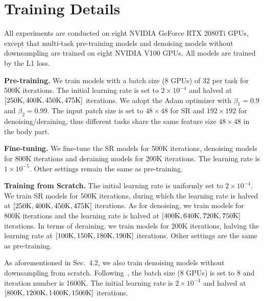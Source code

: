 \documentclass[runningheads]{llncs}
\begin{document}
	\section{Training Details}
	
	All experiments are conducted on eight NVIDIA GeForce RTX 2080Ti GPUs, except that multi-task pre-training models and denoising models without downsampling are trained on eight NVIDIA V100 GPUs. All models are trained by the L1 loss.
	
	
	\vspace{0.05in}
	\noindent\textbf{Pre-training.} We train models with a batch size (8 GPUs) of 32 per task for 500K iterations. The initial learning rate is set to $2 \times 10^{-4}$ and halved at $[250{\rm K}, 400{\rm K}, 450{\rm K}, 475{\rm K}]$ iterations. We adopt the Adam optimizer with $\beta_{1}=0.9$ and $\beta_{2}=0.99$. The input patch size is set to $48 \times 48$ for SR and $192 \times 192$ for denoising/deraining, thus different tasks share the same feature size $48 \times 48$ in the body part.
	
	\vspace{0.05in}
	\noindent\textbf{Fine-tuning.} We fine-tune the SR models for 500K iterations, denoising models for 800K iterations and deraining models for 200K iterations. The learning rate is $1 \times 10^{-5}$. Other settings remain the same as pre-training.
	
	\vspace{0.05in}
	\noindent\textbf{Training from Scratch.} The initial learning rate is uniformly set to $2 \times 10^{-4}$. We train SR models for 500K iterations, during which the learning rate is halved at $[250{\rm K}, 400{\rm K}, 450{\rm K}, 475{\rm K}]$ iterations. As for denoising, we train models for 800K iterations and the learning rate is halved at $[400{\rm K}, 640{\rm K}, 720{\rm K}, 750{\rm K}]$ iterations. In terms of deraining, we train models for 200K iterations, halving the learning rate at $[100{\rm K}, 150{\rm K}, 180{\rm K}, 190{\rm K}]$ iterations. Other settings are the same as pre-training.
	
	As aforementioned in Sec.~{4.2}, we also train denoising models without downsampling from scratch. Following~\cite{liang2021swinir}, the batch size (8 GPUs) is set to 8 and iteration number is 1600K. The initial learning rate is $2 \times 10^{-4}$ and halved at $[800{\rm K}, 1200{\rm K}, 1400{\rm K}, 1500{\rm K}]$ iterations.
	
\end{document}
